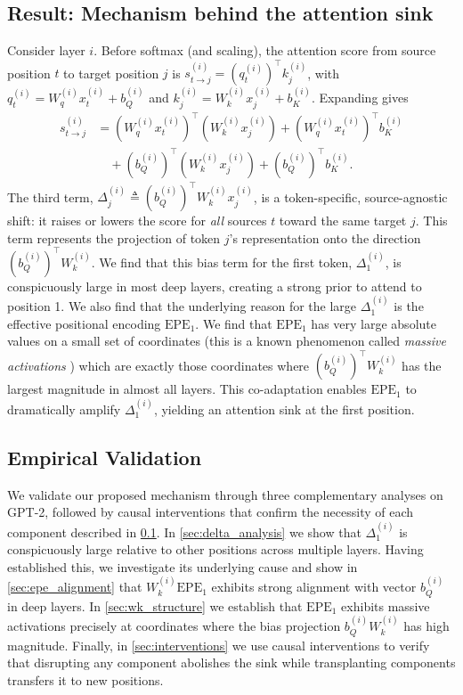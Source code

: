 \documentclass[11pt]{article}
\newif\ifYRMcomments
\newif\ifBacklogcomments
\newcommand{\YRM}[1]{\ifYRMcomments\textcolor{red}{[YRM: #1]}\fi}
\newcommand{\Backlog}[1]{\ifBacklogcomments\textcolor{blue}{[Backlog: #1]}\fi}
\begin{document}
\subsection{Result: Mechanism behind the attention sink}\label{sec:mechanism}
Consider layer $i$. Before softmax (and scaling), the attention score from source position $t$ to target position $j$ is $s_{t\to j}^{(i)} = (q_t^{(i)})^\top k_j^{(i)}$, with $q_t^{(i)} = W_q^{(i)} x_t^{(i)} + b_Q^{(i)}$ and $k_j^{(i)} = W_k^{(i)} x_j^{(i)} + b_K^{(i)}$. Expanding gives
\[
\begin{aligned}
s_{t\to j}^{(i)} &= (W_q^{(i)} x_t^{(i)})^\top (W_k^{(i)} x_j^{(i)}) + (W_q^{(i)} x_t^{(i)})^\top b_K^{(i)} \\
&\quad + (b_Q^{(i)})^\top (W_k^{(i)} x_j^{(i)}) + (b_Q^{(i)})^\top b_K^{(i)}.
\end{aligned}
\]
The third term, $\Delta_j^{(i)} \triangleq (b_Q^{(i)})^\top W_k^{(i)} x_j^{(i)}$, is a token-specific, source-agnostic shift: it raises or lowers the score for \emph{all} sources $t$ toward the same target $j$. This term represents the projection of token $j$'s representation onto the direction $(b_Q^{(i)})^\top W_k^{(i)}$. We find that this bias term for the first token, $\Delta_1^{(i)}$, is conspicuously large in most deep layers, creating a strong prior to attend to position 1. We also find that the underlying reason for the large $\Delta_1^{(i)}$ is the effective positional encoding $\mathrm{EPE}_1$. We find that $\mathrm{EPE}_1$ has very large absolute values on a small set of coordinates (this is a known phenomenon called \textit{massive activations} \YRM{Cite main paper introducing this}) which are exactly those coordinates where $(b_Q^{(i)})^\top W_k^{(i)}$ has the largest magnitude in almost all layers. This co-adaptation enables $\mathrm{EPE}_1$ to dramatically amplify $\Delta_1^{(i)}$, yielding an attention sink at the first position. \Backlog{Can we add a diagram to illustrate this? This sounds time consuming but really really helpful since this passage turned out to be somewhat dense. Let's wait to see how much space we have before doing this}

\subsection{Empirical Validation}
We validate our proposed mechanism through three complementary analyses on GPT-2, followed by causal interventions that confirm the necessity of each component described in \cref{sec:mechanism}. In \cref{sec:delta_analysis} we show that $\Delta_1^{(i)}$ is conspicuously large relative to other positions across multiple layers. Having established this, we investigate its underlying cause and show in \cref{sec:epe_alignment} that $W_k^{(i)}\mathrm{EPE}_1$ exhibits strong alignment with vector $b_Q^{(i)}$ in deep layers. In \cref{sec:wk_structure} we establish that $\mathrm{EPE}_1$ exhibits massive activations precisely at coordinates where the bias projection $b_Q^{(i)} W_k^{(i)}$ has high magnitude. Finally, in \cref{sec:interventions} we use causal interventions to verify that disrupting any component abolishes the sink while transplanting components transfers it to new positions.
\end{document}
